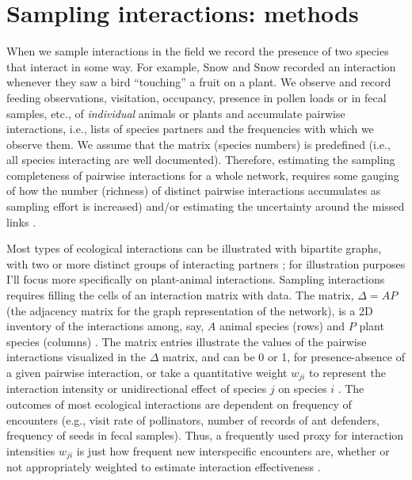\documentclass[12pt]{article}
\begin{document}
\section*{Sampling interactions: methods}
\label{samplinginteractions:methods}
When we sample interactions in the field we record the presence of two species that interact in some way. For example, Snow and Snow\citeyearpar{Snow:1988iu} recorded an interaction whenever they saw a bird ``touching'' a fruit on a plant. We observe and record feeding observations, visitation, occupancy, presence in pollen loads or in fecal samples, etc., of \emph{individual} animals or plants and accumulate pairwise interactions, i.e., lists of species partners and the frequencies with which we observe them. We assume that the matrix (species numbers) is predefined (i.e., all species interacting are well documented). Therefore, estimating the sampling completeness of pairwise interactions for a whole network, requires some gauging of how the number (richness) of distinct pairwise interactions accumulates as sampling effort is increased) and/or estimating the uncertainty around the missed links \citep{Wells:2012dy}. 

Most types of ecological interactions can be illustrated with bipartite graphs, with two or more distinct groups of interacting partners \citep{Bascompte:2014to}; for illustration purposes I'll focus more specifically on plant-animal interactions. Sampling interactions requires filling the cells of an interaction matrix with data. The matrix, $\Delta= AP$ (the adjacency matrix for the graph representation of the network), is a 2D inventory of the interactions among, say, $A$ animal species (rows) and $P$ plant species (columns) \citep{E31/2562,Bascompte:2014to}. The matrix entries illustrate the values of the pairwise interactions visualized in the $\Delta$ matrix, and can be 0 or 1, for presence-absence of a given pairwise interaction, or take a quantitative weight $w_{ji}$ to represent the interaction intensity or unidirectional effect of species $j$ on species $i$ \citep{Bascompte:2014to,Vazquez:2015ec}. The outcomes of most ecological interactions are dependent on frequency of encounters (e.g., visit rate of pollinators, number of records of ant defenders, frequency of seeds in fecal samples). Thus, a frequently used proxy for interaction intensities $w_{ji}$ is just how frequent new interspecific encounters are, whether or not appropriately weighted to estimate interaction effectiveness \citep{Vazquez:2005}. 
\end{document}

